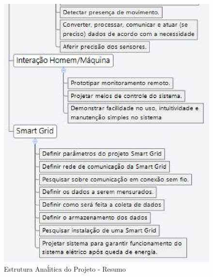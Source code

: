 \begin{figure}[H]
\centering
\includegraphics[keepaspectratio,scale=0.6]{figuras/EAP_automacao2.eps}
\caption{Estrutura Anaĺitica do Projeto - Resumo}
\end{figure}

